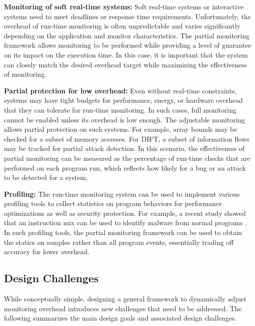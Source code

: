 {\bf Monitoring of soft real-time systems:}
Soft real-time systems or interactive systems need to meet deadlines or response
time requirements. Unfortunately, the overhead of run-time monitoring is often 
unpredictable and varies significantly depending on the application and monitor
characteristics. The partial monitoring framework allows monitoring to be performed
while providing a level of guarantee on its impact on the execution time. 
In this case, it is important that the system can closely match the desired
overhead target while maximizing the effectiveness of monitoring.

{\bf Partial protection for low overhead:}
Even without real-time constraints, systems may have tight budgets for performance,
energy, or hardware overhead that they can tolerate for run-time monitoring. In such cases,
full monitoring cannot be enabled unless its overhead is low enough. The adjustable
monitoring allows partial protection on such systems. For example, array bounds
may be checked for a subset of memory accesses. For DIFT, a subset of information flows
may be tracked for partial attack detection. In this scenario, the effectiveness of 
partial monitoring can be measured as the percentage of run-time checks that are
performed on each program run, which reflects how likely for a bug or an attack 
to be detected for a system. 

{\bf Profiling:} 
The run-time monitoring system can be used to implement various profiling tools
to collect statistics on program behaviors for performance optimizations as well
as security protection. For example, a recent study showed that an instruction
mix can be used to identify malware from normal programs \cite{FIXME}. 
In such profiling tools, the partial monitoring framework can be used to obtain
the statics on samples rather than all program events, essentially trading off
accuracy for lower overhead.

\subsection{Design Challenges}

While conceptually simple, designing a general framework to dynamically adjust monitoring
overhead introduces new challenges that need to be addressed.  
The following summarizes the main design goals and associated design challenges.

